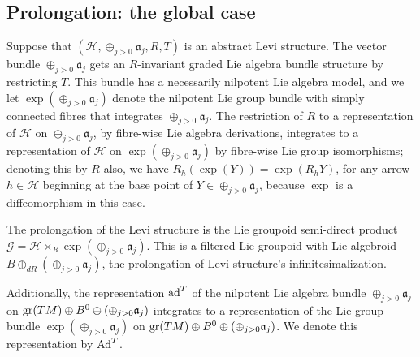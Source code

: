 \documentclass[leqno,12pt]{amsart} %
\begin{document}
\subsection{Prolongation: the global case}\label{abstract_levi_}
Suppose that $({\mathcal H}, \oplus_{j>0}{\mathfrak a}_j, R, T)$ is an abstract Levi
structure. The vector bundle $\oplus_{j>0} {\mathfrak a}_j$ gets an $R$-invariant graded
Lie algebra bundle structure by restricting $T$. This bundle has a necessarily nilpotent
Lie algebra model, and we let $\exp(\oplus_{j>0}{\mathfrak a}_j)$ denote the nilpotent Lie
group bundle with simply connected fibres that integrates $ \oplus_{j>0}{\mathfrak
  a}_j$. The restriction of $R$ to a representation of ${\mathcal H} $ on
$\oplus_{j>0}{\mathfrak a}_j$, by fibre-wise Lie algebra derivations, integrates to a
representation of ${\mathcal H}$ on $\exp(\oplus_{j>0}{\mathfrak a}_j)$ by fibre-wise Lie
group isomorphisms; denoting this by $R$ also, we have $R_h(\exp(Y))=\exp(R_hY)$, for any
arrow $h \in {\mathcal H}$ beginning at the base point of
$Y \in \oplus_{j>0}{\mathfrak a}_j $, because $\exp$ is a diffeomorphism in this case.

The {\df prolongation} of the Levi structure is the Lie groupoid semi-direct
product ${\mathcal G} = {\mathcal H} \times_R\exp(\oplus_{j>0}{\mathfrak a}_j)$. This is
a filtered Lie groupoid with Lie algebroid $B \oplus_{dR} (\oplus_{j>0}{\mathfrak a}_j)$,
the prolongation of Levi structure's infinitesimalization.

Additionally, the representation $\operatorname{ad}^T$ of the nilpotent Lie algebra bundle
$\oplus_{j>0}{\mathfrak a}_j$ on
$\operatorname{\operatorname{gr}}(TM) \oplus B^0 \oplus (\oplus_{j>0}{\mathfrak a}_j)$ integrates to a
representation of the Lie group bundle $\exp(\oplus_{j>0}{\mathfrak a}_j)$ on
$\operatorname{\operatorname{gr}}(TM) \oplus B^0 \oplus (\oplus_{j>0}{\mathfrak a}_j)$. We denote this
representation by $\operatorname{Ad}^T$.
\end{document}
